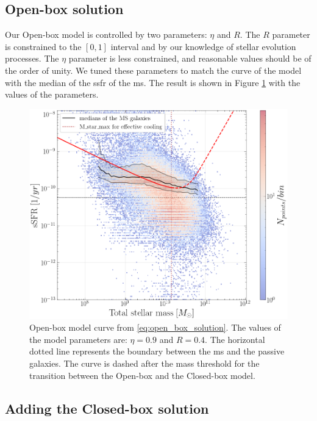 \documentclass[fleqn, usenatbib]{mnras}
\begin{document}
\subsection{Open-box solution}

Our Open-box model is controlled by two parameters: \(\eta\) and \(R\). The \(R\) parameter is constrained to the \([0, 1]\) interval and by our knowledge of stellar evolution processes. The \(\eta\) parameter is less constrained, and reasonable values should be of the order of unity. We tuned these parameters to match the curve of the model with the median of the \acrshort{ssfr} of the \acrshort{ms}. The result is shown in Figure \ref{fig:open_box_model} with the values of the parameters.
\begin{figure}
	\includegraphics[width=\columnwidth]{images/open_box_model.png}
	\caption{Open-box model curve from \eqref{eq:open_box_solution}. The values of the model parameters are: \(\eta = 0.9\) and \(R = 0.4\). The horizontal dotted line represents the boundary between the \acrshort{ms} and the passive galaxies. The curve is dashed after the mass threshold for the transition between the Open-box and the Closed-box model.}
	\label{fig:open_box_model}
\end{figure}

\subsection{Adding the Closed-box solution}
\end{document}
